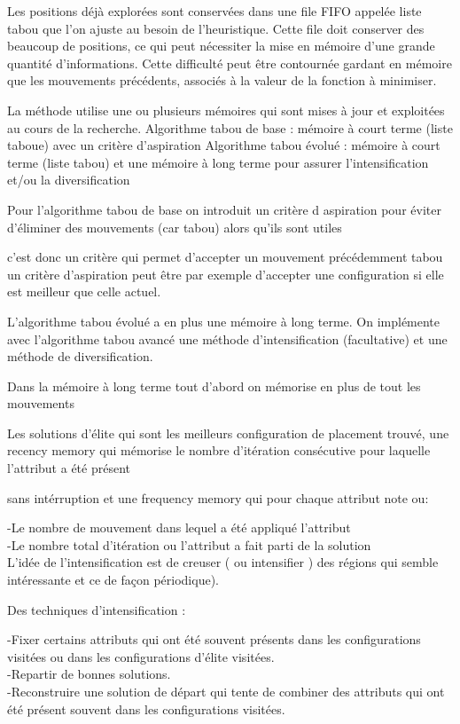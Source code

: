 \documentclass{report}
\begin{document}
Les positions déjà explorées sont conservées dans une file FIFO appelée  liste tabou  que l'on ajuste au besoin de l'heuristique. Cette file doit conserver des beaucoup de positions, ce qui peut  nécessiter la mise en mémoire d'une grande quantité d'informations. Cette difficulté peut être contournée gardant en mémoire que les mouvements précédents, associés à la valeur de la fonction à minimiser.

La méthode utilise une ou plusieurs mémoires  qui sont mises à jour
et exploitées au cours de la recherche.
Algorithme tabou de base : mémoire à court terme (liste taboue) avec un critère d'aspiration
Algorithme tabou évolué : mémoire à court terme (liste tabou) et une mémoire à
long terme pour assurer l’intensification et/ou la diversification

Pour l’algorithme tabou de base on introduit un critère d aspiration
pour éviter d’éliminer des mouvements (car tabou) alors qu’ils sont utiles

c’est donc un critère qui permet d’accepter un mouvement précédemment tabou
un critère d’aspiration peut être par exemple d’accepter une configuration si elle est meilleur que celle actuel.

L’algorithme tabou évolué a en plus une mémoire à long terme. On implémente avec l’algorithme tabou avancé une méthode d’intensification (facultative) et une méthode de diversification.

Dans la mémoire à long terme tout d’abord on mémorise en plus de tout les mouvements

Les solutions d’élite qui sont les meilleurs configuration de placement trouvé, une recency memory qui mémorise le nombre d'itération consécutive pour laquelle l’attribut a été présent

sans intérruption et une frequency memory qui pour chaque attribut note ou:

-Le nombre de mouvement dans lequel a été appliqué l’attribut\\
-Le nombre total d’itération ou l’attribut a fait parti de la solution\\

L’idée de l’intensification est de creuser ( ou intensifier ) des régions qui semble intéressante
et ce de façon périodique).

Des techniques d’intensification :

-Fixer certains attributs qui ont été souvent présents dans les configurations visitées
ou dans les configurations d’élite visitées.\\
-Repartir de bonnes solutions.\\
-Reconstruire une solution de départ qui tente de combiner des attributs qui ont été
présent souvent dans les configurations visitées.\\
\end{document}
